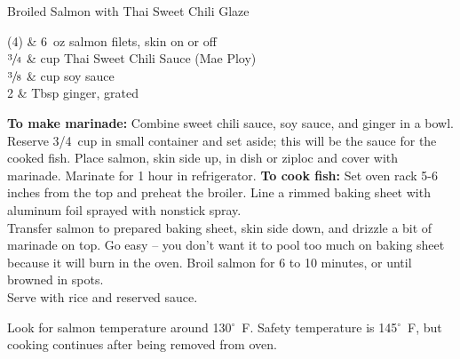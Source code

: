 \setHeadlines
{
}

\begin{recipe}
[ %
    source = CTB prepped meal,
]
{Broiled Salmon with Thai Sweet Chili Glaze}
    
    \ingredients
    {
		(4) & 6~oz salmon filets, skin on or off \\
		$\sfrac{3}{4}$ & cup Thai Sweet Chili Sauce (Mae Ploy) \\
		$\sfrac{3}{8}$ & cup soy sauce \\
		2 & Tbsp ginger, grated \\
    }
    
    \preparation
    {
        \step \textbf{To make marinade:} Combine sweet chili sauce, soy sauce, and ginger in a bowl. Reserve 3/4~cup in small container and set aside; this will be the sauce for the cooked fish.
		\step Place salmon, skin side up, in dish or ziploc and cover with marinade. Marinate for 1 hour in refrigerator.
		\step \textbf{To cook fish:} Set oven rack 5-6 inches from the top and preheat the broiler. 
		\step Line a rimmed baking sheet with aluminum foil sprayed with nonstick spray. \\
		\step Transfer salmon to prepared baking sheet, skin side down, and drizzle a bit of marinade on top. Go easy -- you don't want it to pool too much on baking sheet because it will burn in the oven. 
		\step Broil salmon for 6 to 10 minutes, or until browned in spots. \\
		\step Serve with rice and reserved sauce. 
    }
	
	\hint
	{
		Look for salmon temperature around 130$^{\circ}$~F. Safety temperature is 145$^{\circ}$~F, but cooking continues after being removed from oven. 
	}

\end{recipe}
